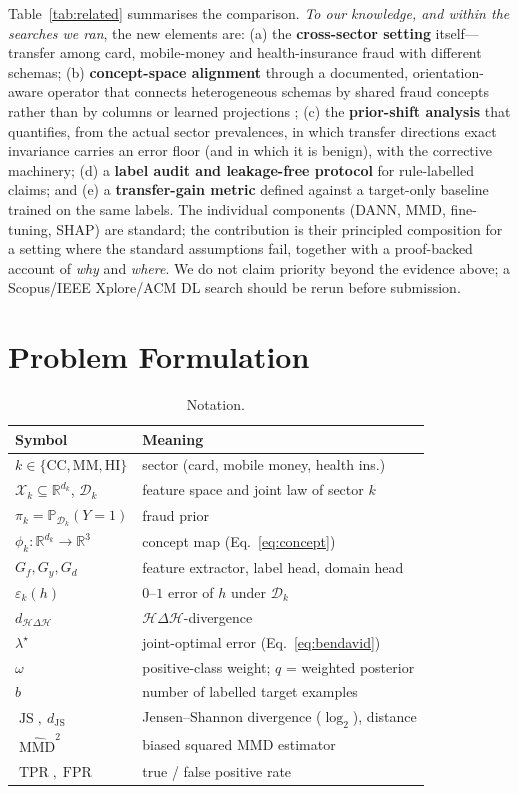 \documentclass[journal]{IEEEtran}
\newcommand{\R}{\mathbb{R}}
\newcommand{\Prob}{\mathbb{P}}
\newcommand{\1}{\mathbf{1}}
\newcommand{\Hspace}{\mathcal{H}}
\newcommand{\Xspace}{\mathcal{X}}
\DeclareMathOperator{\MMD}{MMD}
\DeclareMathOperator{\JS}{JS}
\DeclareMathOperator{\TPR}{TPR}
\DeclareMathOperator{\FPR}{FPR}
\begin{document}
Table~\ref{tab:related} summarises the comparison. \emph{To our knowledge, and within the searches we ran}, the new elements are: (a) the \textbf{cross-sector setting} itself---transfer among card, mobile-money and health-insurance fraud with different schemas; (b) \textbf{concept-space alignment} through a documented, orientation-aware operator that connects heterogeneous schemas by shared fraud concepts rather than by columns \cite{koutras2020valentine} or learned projections \cite{duan2012hfa}; (c) the \textbf{prior-shift analysis} that quantifies, from the actual sector prevalences, in which transfer directions exact invariance carries an error floor (and in which it is benign), with the corrective machinery; (d) a \textbf{label audit and leakage-free protocol} for rule-labelled claims; and (e) a \textbf{transfer-gain metric} defined against a target-only baseline trained on the same labels. The individual components (DANN, MMD, fine-tuning, SHAP) are standard; the contribution is their principled composition for a setting where the standard assumptions fail, together with a proof-backed account of \emph{why} and \emph{where}. We do not claim priority beyond the evidence above; a Scopus/IEEE Xplore/ACM DL search should be rerun before submission.

\section{Problem Formulation}\label{sec:problem}
\begin{table}[t]
\centering
\caption{Notation.}
\label{tab:notation}
\small
\begin{tabular}{@{}ll@{}}
\toprule
Symbol & Meaning \\
\midrule
$k\in\{\mathrm{CC},\mathrm{MM},\mathrm{HI}\}$ & sector (card, mobile money, health ins.) \\
$\Xspace_k\subseteq\R^{d_k}$, $\mathcal D_k$ & feature space and joint law of sector $k$ \\
$\pi_k=\Prob_{\mathcal D_k}(Y{=}1)$ & fraud prior \\
$\phi_k:\R^{d_k}\to\R^3$ & concept map (Eq.~\eqref{eq:concept}) \\
$G_f,G_y,G_d$ & feature extractor, label head, domain head \\
$\varepsilon_k(h)$ & $0$--$1$ error of $h$ under $\mathcal D_k$ \\
$d_{\Hspace\Delta\Hspace}$ & $\Hspace\Delta\Hspace$-divergence \\
$\lambda^\star$ & joint-optimal error (Eq.~\eqref{eq:bendavid}) \\
$\omega$ & positive-class weight; $q$ = weighted posterior \\
$b$ & number of labelled target examples \\
$\JS,\ d_{\JS}$ & Jensen--Shannon divergence ($\log_2$), distance \\
$\widehat{\MMD}^2$ & biased squared MMD estimator \\
$\TPR,\FPR$ & true / false positive rate \\
\bottomrule
\end{tabular}
\end{table}
\end{document}
